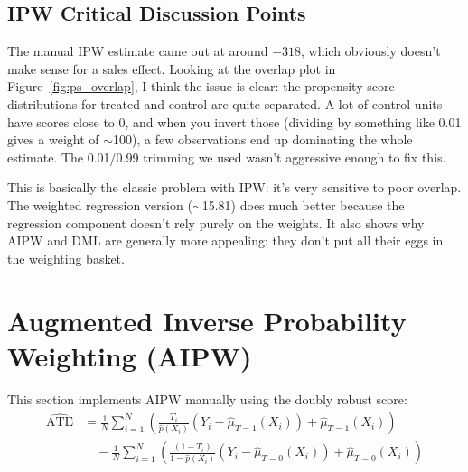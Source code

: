 \documentclass[12pt,a4paper]{article}
\begin{document}
\subsection{IPW Critical Discussion Points}

The manual IPW estimate came out at around $-318$, which obviously doesn't make sense for a sales effect. Looking at the overlap plot in Figure~\ref{fig:ps_overlap}, I think the issue is clear: the propensity score distributions for treated and control are quite separated. A lot of control units have scores close to 0, and when you invert those (dividing by something like 0.01 gives a weight of $\sim$100), a few observations end up dominating the whole estimate. The 0.01/0.99 trimming we used wasn't aggressive enough to fix this.

This is basically the classic problem with IPW: it's very sensitive to poor overlap. The weighted regression version ($\sim$15.81) does much better because the regression component doesn't rely purely on the weights. It also shows why AIPW and DML are generally more appealing: they don't put all their eggs in the weighting basket.

\section{Augmented Inverse Probability Weighting (AIPW)}

This section implements AIPW manually using the doubly robust score:
\begin{align*}
\widehat{\text{ATE}} &= \frac{1}{N}\sum_{i=1}^{N} \left( \frac{T_i}{\hat{p}(X_i)}(Y_i - \hat{\mu}_{T=1}(X_i)) + \hat{\mu}_{T=1}(X_i) \right) \\
&\quad - \frac{1}{N}\sum_{i=1}^{N} \left( \frac{(1-T_i)}{1-\hat{p}(X_i)}(Y_i - \hat{\mu}_{T=0}(X_i)) + \hat{\mu}_{T=0}(X_i) \right)
\end{align*}
\end{document}
